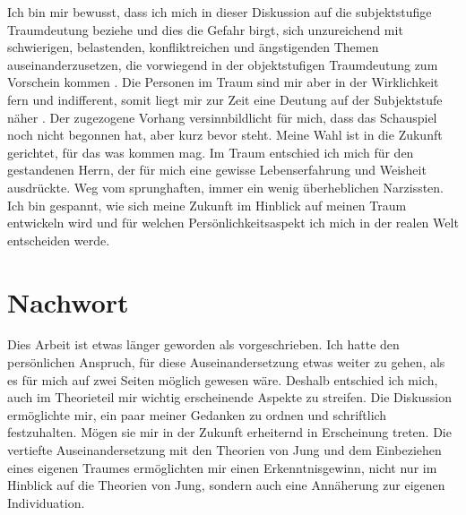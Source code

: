 Ich bin mir bewusst, dass ich mich in dieser Diskussion auf die subjektstufige Traumdeutung beziehe und dies die Gefahr birgt, sich unzureichend mit schwierigen, belastenden, konfliktreichen und ängstigenden Themen auseinanderzusetzen, die vorwiegend in der objektstufigen Traumdeutung zum Vorschein kommen \cite{Roth:2011}. Die Personen im Traum sind mir aber in der Wirklichkeit fern und indifferent, somit liegt mir zur Zeit eine Deutung auf der Subjektstufe näher \cite{Jung:1971}. \newline 
Der zugezogene Vorhang versinnbildlicht für mich, dass das Schauspiel noch nicht begonnen hat, aber kurz bevor steht. Meine Wahl ist in die Zukunft gerichtet, für das was kommen mag. Im Traum entschied ich mich für den gestandenen Herrn, der für mich eine gewisse Lebenserfahrung und Weisheit ausdrückte. Weg vom sprunghaften, immer ein wenig überheblichen Narzissten. \newline 
Ich bin gespannt, wie sich meine Zukunft im Hinblick auf meinen Traum entwickeln wird und für welchen Persönlichkeitsaspekt ich mich in der realen Welt entscheiden werde.
\section*{Nachwort}\label{section.nachwort}
Dies Arbeit ist etwas länger geworden als vorgeschrieben. Ich hatte den persönlichen Anspruch, für diese Auseinandersetzung etwas weiter zu gehen, als es für mich auf zwei Seiten möglich gewesen wäre. Deshalb entschied ich mich, auch im Theorieteil mir wichtig erscheinende Aspekte zu streifen. Die Diskussion ermöglichte mir, ein paar meiner Gedanken zu ordnen und schriftlich festzuhalten. Mögen sie mir in der Zukunft erheiternd in Erscheinung treten.\newline
Die vertiefte Auseinandersetzung mit den Theorien von Jung und dem Einbeziehen eines eigenen Traumes ermöglichten mir einen Erkenntnisgewinn, nicht nur im Hinblick auf die Theorien von Jung, sondern auch eine Annäherung zur eigenen Individuation.




